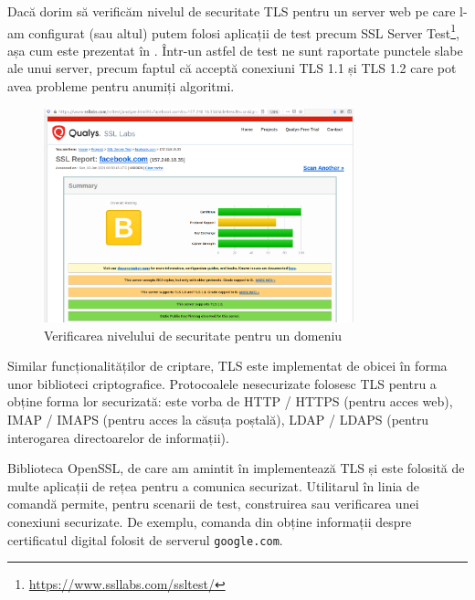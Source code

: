 Dacă dorim să verificăm nivelul de securitate TLS pentru un server web pe care l-am configurat (sau altul) putem folosi aplicații de test precum SSL Server Test\footnote{\url{https://www.ssllabs.com/ssltest/}}, așa cum este prezentat în . Într-un astfel de test ne sunt raportate punctele slabe ale unui server, precum faptul că acceptă conexiuni TLS 1.1 și TLS 1.2 care pot avea probleme pentru anumiți algoritmi.

\begin{figure}[!htbp]
  \centering
  \includegraphics[width=0.8\textwidth]{chapters/12-sec/img/ssllabs.png}
  \caption{Verificarea nivelului de securitate pentru un domeniu}
  \label{fig:sec:ssllabs}
\end{figure}

Similar funcționalităților de criptare, TLS este implementat de obicei în forma unor biblioteci criptografice. Protocoalele nesecurizate folosesc TLS pentru a obține forma lor securizată: este vorba de HTTP / HTTPS (pentru acces web), IMAP / IMAPS (pentru acces la căsuța poștală), LDAP / LDAPS (pentru interogarea directoarelor de informații).

Biblioteca OpenSSL, de care am amintit în  implementează TLS și este folosită de multe aplicații de rețea pentru a comunica securizat. Utilitarul în linia de comandă  permite, pentru scenarii de test, construirea sau verificarea unei conexiuni securizate. De exemplu, comanda din  obține informații despre certificatul digital folosit de serverul \texttt{google.com}.


